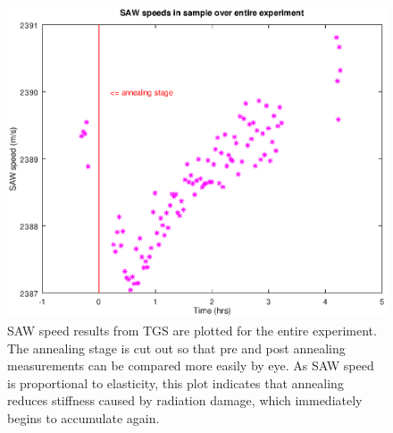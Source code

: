 \begin{figure}[pt]
\begin{center}
\includegraphics[width=\textwidth]{./images/SAW_speeds.eps}
\caption{SAW speed results from TGS are plotted for the entire experiment. The annealing stage is cut out so that pre and post annealing measurements can be compared more easily by eye. As SAW speed is proportional to elasticity, this plot indicates that annealing reduces stiffness caused by radiation damage, which immediately begins to accumulate again.}
\label{SAW_speeds}
\end{center}
\end{figure}






